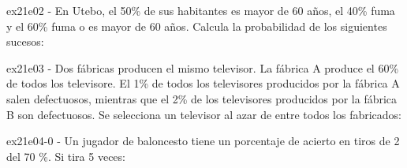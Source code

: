 \documentclass[spanish, 11pt]{exam}
\begin{document}
        \begin{questions}
        \question ex21e02 - En Utebo, el 50\% de sus habitantes es mayor de 60 años, el 40\% fuma y el 60\% 
fuma o es mayor de 60 años. 
Calcula la probabilidad de los siguientes sucesos:
        \begin{multicols}{2}
        \end{multicols}
        \question ex21e03 - Dos fábricas producen el mismo televisor. La fábrica A produce el 60\% de todos los televisore.
El 1\% de todos los televisores producidos por la fábrica A salen defectuosos, mientras que el 2\% de los
televisores producidos por la fábrica B son defectuosos. Se selecciona un televisor al azar de entre
todos los fabricados:

        \begin{multicols}{2}
        \end{multicols}
        \question ex21e04-0 - Un jugador de baloncesto tiene un porcentaje de acierto en tiros de 2 del 70 \%. Si tira 5
veces:\\ 
    

\end{questions}
\end{document}
